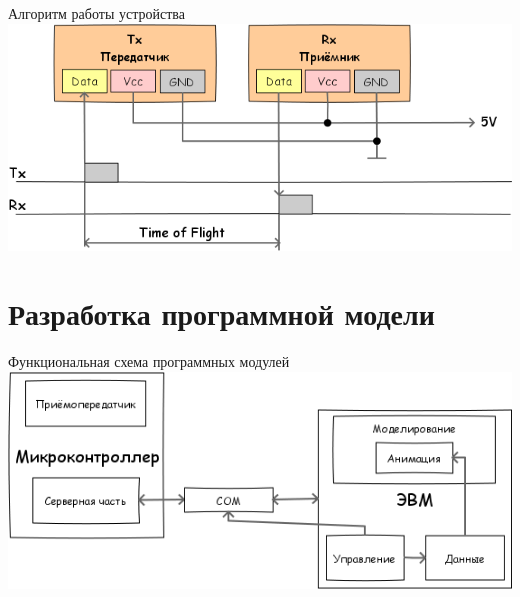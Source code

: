 \begin{frame}{Алгоритм работы устройства}
    \centering
    \includegraphics[width=1\linewidth]{../Figures/physalg.png}
\end{frame}

\section{Разработка программной модели}

\begin{frame}{Функциональная схема программных модулей}
    \centering
    \includegraphics[width=1\linewidth]{../Figures/softwarefunc.png}
\end{frame}

